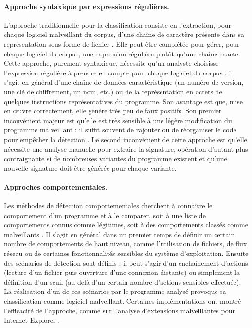 \paragraph{Approche syntaxique par expressions régulières.}
L'approche traditionnelle pour la classification consiste en l'extraction, pour chaque logiciel malveillant du corpus, d'une chaîne de caractère présente dans sa représentation sous forme de fichier \cite{Szor05}.
Elle peut être complétée pour gérer, pour chaque logiciel du corpus, une expression régulière plutôt qu'une chaîne exacte.
Cette approche, purement syntaxique, nécessite qu'un analyste choisisse l'expression régulière à prendre en compte pour chaque logiciel du corpus : il s'agit en général d'une chaîne de données caractéristique (un numéro de version, une clé de chiffrement, un nom, etc.) ou de la représentation en octets de quelques instructions représentatives du programme.
Son avantage est que, mise en \oe uvre correctement, elle génère très peu de faux positifs. Son premier inconvénient majeur est qu'elle est très sensible à une légère modification du programme malveillant : il suffit souvent de rajouter ou de réorganiser le code pour empêcher la détection \cite{CJ04}. Le second inconvénient de cette approche est qu'elle nécessite une analyse manuelle pour extraire la signature, opération d'autant plus contraignante si de nombreuses variantes du programme existent et qu'une nouvelle signature doit être générée pour chaque variante.

\paragraph{Approches comportementales.}
Les méthodes de détection comportementales cherchent à connaître le comportement d'un programme et à le comparer, soit à une liste de comportements connus comme légitimes, soit à des comportements classés comme malveillants \cite{JDF08}.
Il s'agit en général dans un premier temps de définir un certain nombre de comportements de haut niveau, comme l'utilisation de fichiers, de flux réseau ou de certaines fonctionnalités sensibles du système d'exploitation.
Ensuite des scénarios de détection sont définis : il peut s'agir d'un enchaînement d'actions (lecture d'un fichier puis ouverture d'une connexion distante) ou simplement la définition d'un seuil (au delà d'un certain nombre d'actions sensibles effectuée).
La réalisation d'un de ces scénarios par le programme analysé provoque sa classification comme logiciel malveillant.
Certaines implémentations ont montré l'efficacité de l'approche, comme sur l'analyse d'extensions malveillantes pour Internet Explorer \cite{KKBVK06}.

